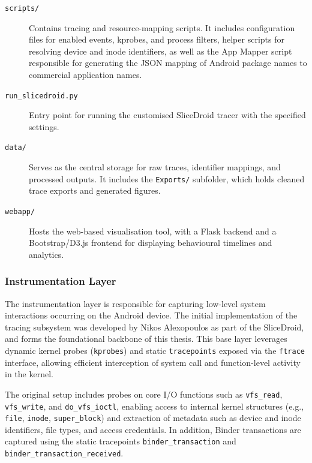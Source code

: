 \documentclass[a4paper,12pt]{report}
\begin{document}
\begin{description}
  \item[\texttt{scripts/}] Contains tracing and resource-mapping scripts. It includes configuration files for enabled events, kprobes, and process filters, helper scripts for resolving device and inode identifiers, as well as the App Mapper script responsible for generating the JSON mapping of Android package names to commercial application names.

  \item[\texttt{run\_slicedroid.py}] Entry point for running the customised SliceDroid tracer with the specified settings.

  \item[\texttt{data/}] Serves as the central storage for raw traces, identifier mappings, and processed outputs. It includes the \texttt{Exports/} subfolder, which holds cleaned trace exports and generated figures.

  \item[\texttt{webapp/}] Hosts the web-based visualisation tool, with a Flask backend and a Bootstrap/D3.js frontend for displaying behavioural timelines and analytics.
\end{description}

\subsubsection{Instrumentation Layer}

The instrumentation layer is responsible for capturing low-level system interactions occurring on the Android device. The initial implementation of the tracing subsystem was developed by Nikos Alexopoulos as part of the SliceDroid, and forms the foundational backbone of this thesis. This base layer leverages dynamic kernel probes (\texttt{kprobes}) and static \texttt{tracepoints} exposed via the \texttt{ftrace} interface, allowing efficient interception of system call and function-level activity in the kernel.

The original setup includes probes on core I/O functions such as \texttt{vfs\_read}, \\ \texttt{vfs\_write}, and \texttt{do\_vfs\_ioctl}, enabling access to internal kernel structures (e.g., \texttt{file}, \texttt{inode}, \texttt{super\_block}) and extraction of metadata such as device and inode identifiers, file types, and access credentials. In addition, Binder transactions are captured using the static tracepoints \texttt{binder\_transaction} and \texttt{binder\_transaction\_received}.
\end{document}
